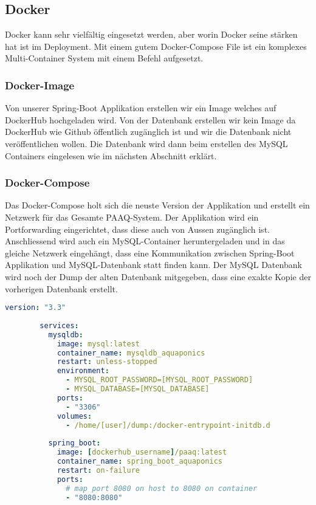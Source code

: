 \documentclass[../main.tex]{subfiles}
\begin{document}
	\subsection{Docker}
	Docker kann sehr vielfältig eingesetzt werden, aber worin Docker seine stärken hat ist im Deployment. Mit einem gutem Docker-Compose File ist ein komplexes Multi-Container System mit einem Befehl aufgesetzt.
	
	\subsubsection{Docker-Image}
	Von unserer Spring-Boot Applikation erstellen wir ein Image welches auf DockerHub hochgeladen wird. Von der Datenbank erstellen wir kein Image da DockerHub wie Github öffentlich zugänglich ist und wir die Datenbank nicht veröffentlichen wollen. Die Datenbank wird dann beim erstellen des MySQL Containers eingelesen wie im nächsten Abschnitt erklärt.
	
	\subsubsection{Docker-Compose}
	Das Docker-Compose holt sich die neuste Version der Applikation und erstellt ein Netzwerk für das Gesamte PAAQ-System. Der Applikation wird ein Portforwarding eingerichtet, dass diese auch von Aussen zugänglich ist. Anschliessend wird auch ein MySQL-Container heruntergeladen und in das gleiche Netzwerk eingehängt, dass eine Kommunikation zwischen Spring-Boot Applikation und MySQL-Datenbank statt finden kann. Der MySQL Datenbank wird noch der Dump der alten Datenbank mitgegeben, dass eine exakte Kopie der vorherigen Datenbank erstellt.
	\begin{lstlisting}[language=yaml]
		version: "3.3"
		
		services:
		  mysqldb:
		    image: mysql:latest
		    container_name: mysqldb_aquaponics
		    restart: unless-stopped
		    environment:
		      - MYSQL_ROOT_PASSWORD=[MYSQL_ROOT_PASSWORD]
		      - MYSQL_DATABASE=[MYSQL_DATABASE]
		    ports:
		      - "3306"
		    volumes:
		      - /home/[user]/dump:/docker-entrypoint-initdb.d
		      
		  spring_boot:
		    image: [dockerhub_username]/paaq:latest
		    container_name: spring_boot_aquaponics
		    restart: on-failure
		    ports:
		      # map port 8080 on host to 8080 on container
		      - "8080:8080"
	\end{lstlisting}
\end{document}

